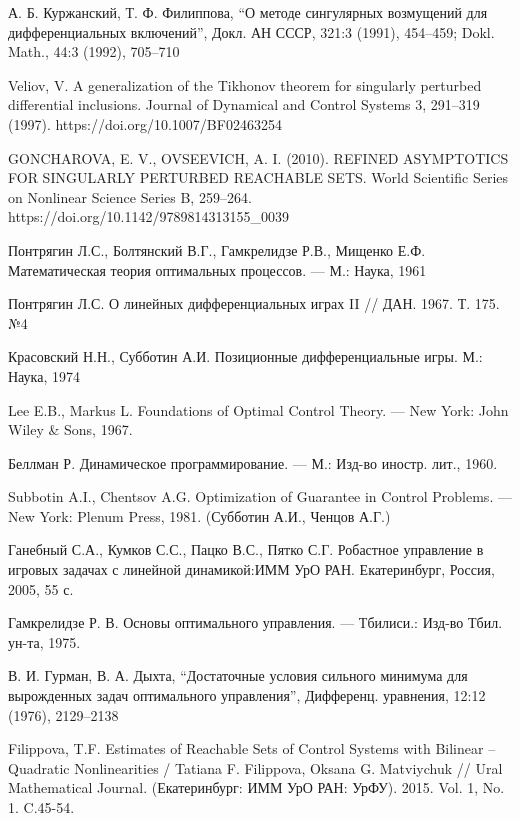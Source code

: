 \documentclass[../main.tex]{subfiles}
\begin{document}
\begin{thebibliography}{99}
А. Б. Куржанский, Т. Ф. Филиппова, “О методе сингулярных возмущений для дифференциальных включений”, Докл. АН СССР, 321:3 (1991), 454–459; Dokl. Math., 44:3 (1992), 705–710

Veliov, V. A generalization of the Tikhonov theorem for singularly perturbed differential inclusions. Journal of Dynamical and Control Systems 3, 291–319 (1997). https://doi.org/10.1007/BF02463254

GONCHAROVA, E. V.,  OVSEEVICH, A. I. (2010). REFINED ASYMPTOTICS FOR SINGULARLY PERTURBED REACHABLE SETS. World Scientific Series on Nonlinear Science Series B, 259–264. https://doi.org/10.1142/9789814313155\_0039

Понтрягин Л.С., Болтянский В.Г., Гамкрелидзе Р.В., Мищенко Е.Ф. Математическая теория оптимальных процессов. — М.: Наука, 1961

Понтрягин Л.С. О линейных дифференциальных играх II // ДАН. 1967. Т. 175. №4

Красовский Н.Н., Субботин А.И. Позиционные дифференциальные игры. М.: Наука, 1974

Lee E.B., Markus L. Foundations of Optimal Control Theory. — New York: John Wiley \& Sons, 1967.

Беллман Р. Динамическое программирование. — М.: Изд-во иностр. лит., 1960.

Subbotin A.I., Chentsov A.G. Optimization of Guarantee in Control Problems. — New York: Plenum Press, 1981. (Субботин А.И., Ченцов А.Г.)

Ганебный С.А., Кумков С.С., Пацко В.С., Пятко С.Г.
Робастное управление в игровых задачах с линейной
динамикой:ИММ УрО РАН. Екатеринбург, Россия, 2005, 55 с.

Гамкрелидзе Р. В. Основы оптимального управления. — Тбилиси.: Изд-во Тбил. ун-та, 1975.

В. И. Гурман, В. А. Дыхта, “Достаточные условия сильного минимума для вырожденных задач оптимального управления”, Дифференц. уравнения, 12:12 (1976), 2129–2138

Filippova, T.F. Estimates of Reachable Sets of Control Systems with Bilinear – Quadratic Nonlinearities / Tatiana F. Filippova, Oksana G. Matviychuk // Ural Mathematical Journal. (Екатеринбург: ИММ УрО РАН: УрФУ). 2015. Vol. 1, No. 1. C.45-54. 


\end{thebibliography}
\end{document}

